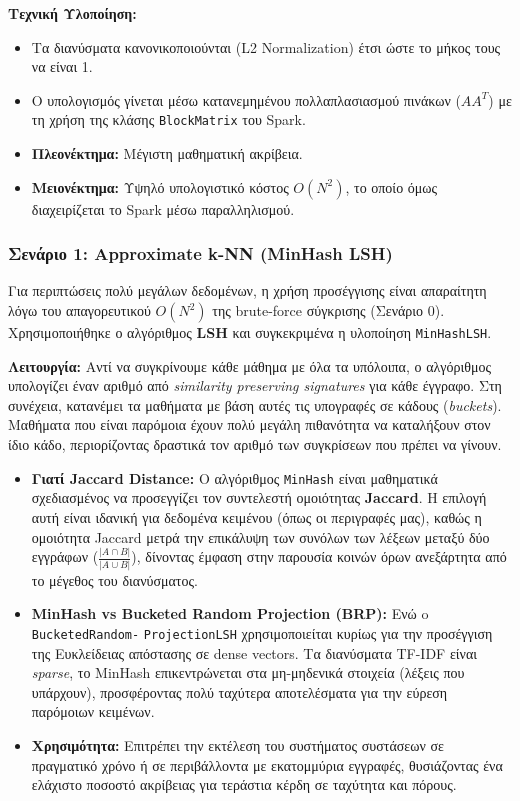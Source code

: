 \documentclass[a4paper,12pt]{article}
\begin{document}
\textbf{Τεχνική Υλοποίηση:} 
\begin{itemize} 
    \item Τα διανύσματα κανονικοποιούνται (L2 Normalization) έτσι ώστε το μήκος τους να είναι 1. 
    \item Ο υπολογισμός γίνεται μέσω κατανεμημένου πολλαπλασιασμού πινάκων ($A A^T$) με τη χρήση της κλάσης \texttt{BlockMatrix} του Spark.
    \item \textbf{Πλεονέκτημα:} Μέγιστη μαθηματική ακρίβεια. 
    \item \textbf{Μειονέκτημα:} Υψηλό υπολογιστικό κόστος $O(N^2)$, το οποίο όμως διαχειρίζεται το Spark μέσω παραλληλισμού. 
\end{itemize}

\subsubsection{Σενάριο 1: Approximate k-NN (MinHash LSH)} 
Για περιπτώσεις πολύ μεγάλων δεδομένων, η χρήση προσέγγισης είναι απαραίτητη λόγω του απαγορευτικού $O(N^2)$ της brute-force σύγκρισης (Σενάριο 0). Χρησιμοποιήθηκε ο αλγόριθμος \textbf{LSH} και συγκεκριμένα η υλοποίηση \texttt{MinHashLSH}.

\textbf{Λειτουργία:} Αντί να συγκρίνουμε κάθε μάθημα με όλα τα υπόλοιπα, ο αλγόριθμος υπολογίζει έναν αριθμό από \textit{similarity preserving signatures} για κάθε έγγραφο. Στη συνέχεια, κατανέμει τα μαθήματα με βάση αυτές τις υπογραφές σε κάδους (\textit{buckets}). Μαθήματα που είναι παρόμοια έχουν πολύ μεγάλη πιθανότητα να καταλήξουν στον ίδιο κάδο, περιορίζοντας δραστικά τον αριθμό των συγκρίσεων που πρέπει να γίνουν. 

\begin{itemize} 
    \item \textbf{Γιατί Jaccard Distance:} Ο αλγόριθμος \texttt{MinHash} είναι μαθηματικά σχεδιασμένος να προσεγγίζει τον συντελεστή ομοιότητας \textbf{Jaccard}. Η επιλογή αυτή είναι ιδανική για δεδομένα κειμένου (όπως οι περιγραφές μας), καθώς η ομοιότητα Jaccard μετρά την επικάλυψη των συνόλων των λέξεων μεταξύ δύο εγγράφων ($\frac {|A \cap B|}{|A \cup B|}$), δίνοντας έμφαση στην παρουσία κοινών όρων ανεξάρτητα από το μέγεθος του διανύσματος.
    
    \item \textbf{MinHash vs Bucketed Random Projection (BRP):} Ενώ o \texttt{BucketedRandom-} \texttt{ProjectionLSH} χρησιμοποιείται κυρίως για την προσέγγιση της Ευκλείδειας απόστασης σε dense vectors. Τα διανύσματα TF-IDF είναι \textit{sparse}, το MinHash επικεντρώνεται στα μη-μηδενικά στοιχεία (λέξεις που υπάρχουν), προσφέροντας πολύ ταχύτερα αποτελέσματα για την εύρεση παρόμοιων κειμένων.
    
    \item \textbf{Χρησιμότητα:} Επιτρέπει την εκτέλεση του συστήματος συστάσεων σε πραγματικό χρόνο ή σε περιβάλλοντα με εκατομμύρια εγγραφές, θυσιάζοντας ένα ελάχιστο ποσοστό ακρίβειας για τεράστια κέρδη σε ταχύτητα και πόρους.
\end{itemize}
\end{document}
